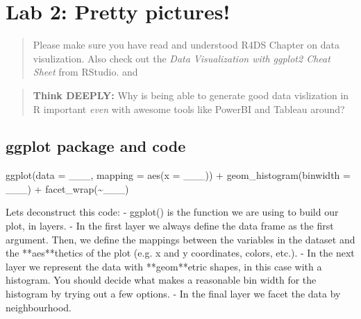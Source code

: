 \documentclass[
]{book}
\newenvironment{Shaded}{\begin{snugshade}}{\end{snugshade}}
\newcommand{\AttributeTok}[1]{\textcolor[rgb]{0.77,0.63,0.00}{#1}}
\newcommand{\FunctionTok}[1]{\textcolor[rgb]{0.00,0.00,0.00}{#1}}
\newcommand{\NormalTok}[1]{#1}
\newcommand{\SpecialCharTok}[1]{\textcolor[rgb]{0.00,0.00,0.00}{#1}}
\newcommand{\StringTok}[1]{\textcolor[rgb]{0.31,0.60,0.02}{#1}}
\begin{document}
\hypertarget{lab-2-pretty-pictures}{%
\chapter{Lab 2: Pretty pictures!}\label{lab-2-pretty-pictures}}

\begin{quote}
Please make sure you have read and understood R4DS Chapter
on data visulization. Also check out the \emph{Data
Visualization with ggplot2 Cheat Sheet} from RStudio.
and
\end{quote}

\begin{quote}
\textbf{Think DEEPLY:} Why is being able to generate good data vislization in R important \emph{even} with awesome tools like PowerBI and Tableau around?
\end{quote}

\hypertarget{ggplot-package-and-code}{%
\section{ggplot package and code}\label{ggplot-package-and-code}}

\begin{Shaded}
\begin{Highlighting}[]
\FunctionTok{ggplot}\NormalTok{(}\AttributeTok{data =}\NormalTok{ \_\_\_, }\AttributeTok{mapping =} \FunctionTok{aes}\NormalTok{(}\AttributeTok{x =}\NormalTok{ \_\_\_)) }\SpecialCharTok{+}
  \FunctionTok{geom\_histogram}\NormalTok{(}\AttributeTok{binwidth =}\NormalTok{ \_\_\_) }\SpecialCharTok{+}
  \FunctionTok{facet\_wrap}\NormalTok{(}\SpecialCharTok{\textasciitilde{}}\NormalTok{\_\_\_)}

\NormalTok{Let}\StringTok{\textquotesingle{}s deconstruct this code: }
\StringTok{{-} \textasciigrave{}ggplot()\textasciigrave{} is the function we are using to build our plot, in layers.}
\StringTok{{-} In the first layer we always define the data frame as the first argument. Then, we define the mappings between the variables in the dataset and the **aes**thetics of the plot (e.g. x and y coordinates, colors, etc.). }
\StringTok{{-} In the next layer we represent the data with **geom**etric shapes, in this case with a histogram. You should decide what makes a reasonable bin width for the histogram by trying out a few options.}
\StringTok{{-} In the final layer we facet the data by neighbourhood.}
\end{Highlighting}
\end{Shaded}
\end{document}
